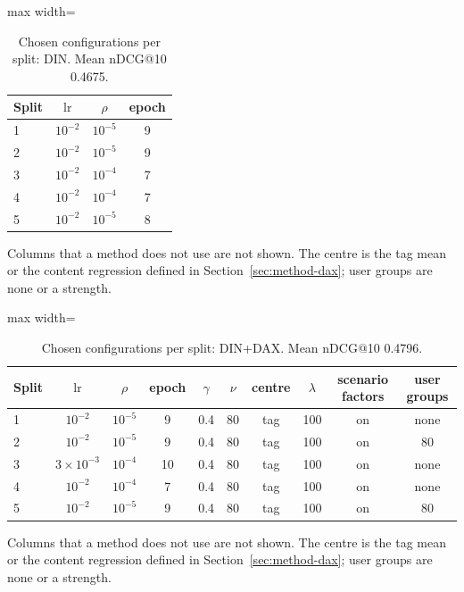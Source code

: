 \documentclass[preprint,12pt,authoryear]{elsarticle}
\begin{document}
\begin{table}[tbp]
\centering
\footnotesize
\caption{Chosen configurations per split: DIN. Mean nDCG@10 0.4675.}
\label{tab:grid08}
\begin{adjustbox}{max width=\linewidth}
\begin{tabular}{lccc}
\toprule
Split & $\mathrm{lr}$ & $\rho$ & epoch \\
\midrule
1 & $10^{-2}$ & $10^{-5}$ & 9 \\
2 & $10^{-2}$ & $10^{-5}$ & 9 \\
3 & $10^{-2}$ & $10^{-4}$ & 7 \\
4 & $10^{-2}$ & $10^{-4}$ & 7 \\
5 & $10^{-2}$ & $10^{-5}$ & 8 \\
\bottomrule
\end{tabular}
\end{adjustbox}
\par\smallskip
\begin{minipage}{\linewidth}\raggedright\footnotesize Columns that a method does not use are not shown. The centre is the tag mean or the content regression defined in Section~\ref{sec:method-dax}; user groups are none or a strength.\end{minipage}
\end{table}

\begin{table}[tbp]
\centering
\footnotesize
\caption{Chosen configurations per split: DIN+DAX. Mean nDCG@10 0.4796.}
\label{tab:grid09}
\begin{adjustbox}{max width=\linewidth}
\begin{tabular}{lccccccccc}
\toprule
Split & $\mathrm{lr}$ & $\rho$ & epoch & $\gamma$ & $\nu$ & centre & $\lambda$ & scenario factors & user groups \\
\midrule
1 & $10^{-2}$ & $10^{-5}$ & 9 & 0.4 & 80 & tag & 100 & on & none \\
2 & $10^{-2}$ & $10^{-5}$ & 9 & 0.4 & 80 & tag & 100 & on & 80 \\
3 & $3\times10^{-3}$ & $10^{-4}$ & 10 & 0.4 & 80 & tag & 100 & on & none \\
4 & $10^{-2}$ & $10^{-4}$ & 7 & 0.4 & 80 & tag & 100 & on & none \\
5 & $10^{-2}$ & $10^{-5}$ & 9 & 0.4 & 80 & tag & 100 & on & 80 \\
\bottomrule
\end{tabular}
\end{adjustbox}
\par\smallskip
\begin{minipage}{\linewidth}\raggedright\footnotesize Columns that a method does not use are not shown. The centre is the tag mean or the content regression defined in Section~\ref{sec:method-dax}; user groups are none or a strength.\end{minipage}
\end{table}
\end{document}
